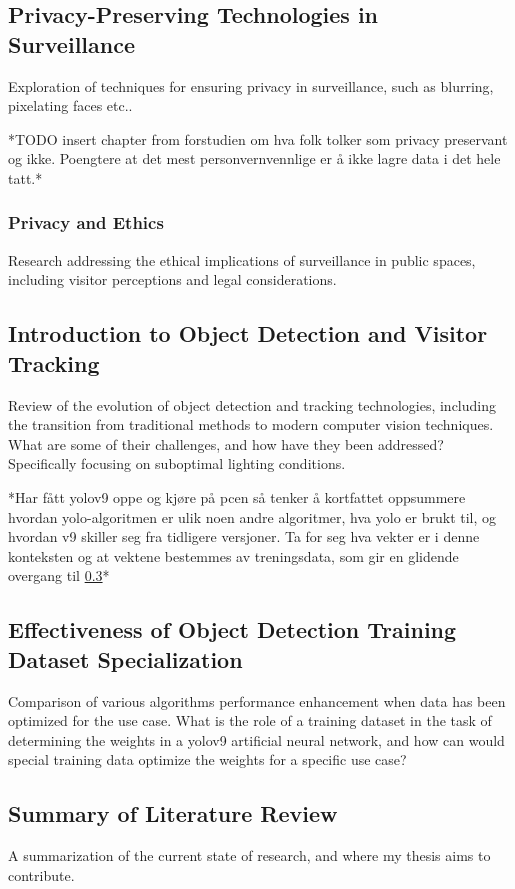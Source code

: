 \subsection{Privacy-Preserving Technologies in Surveillance}
Exploration of techniques for ensuring privacy in surveillance, such as blurring, pixelating faces etc.. 

*TODO insert chapter from forstudien om hva folk tolker som privacy preservant og ikke. Poengtere at det mest personvernvennlige er å ikke lagre data i det hele tatt.*

\subsubsection{Privacy and Ethics}
Research addressing the ethical implications of surveillance in public spaces, including visitor perceptions and legal considerations.

\subsection{Introduction to Object Detection and Visitor Tracking}
Review of the evolution of object detection and tracking technologies, including the transition from traditional methods to modern computer vision techniques. What are some of their challenges, and how have they been addressed? Specifically focusing on suboptimal lighting conditions.

*Har fått yolov9 oppe og kjøre på pcen så tenker å kortfattet oppsummere hvordan yolo-algoritmen er ulik noen andre algoritmer, hva yolo er brukt til, og hvordan v9 skiller seg fra tidligere versjoner. Ta for seg hva vekter er i denne konteksten og at vektene bestemmes av treningsdata, som gir en glidende overgang til \ref{sec:dataset_specialization}* 

\subsection{Effectiveness of Object Detection Training Dataset Specialization}
\label{sec:dataset_specialization}
Comparison of various algorithms performance enhancement when data has been optimized for the use case. What is the role of a training dataset in the task of determining the weights in a yolov9 artificial neural network, and how can would special training data optimize the weights for a specific use case?

\subsection{Summary of Literature Review}
A summarization of the current state of research, and where my thesis aims to contribute.

